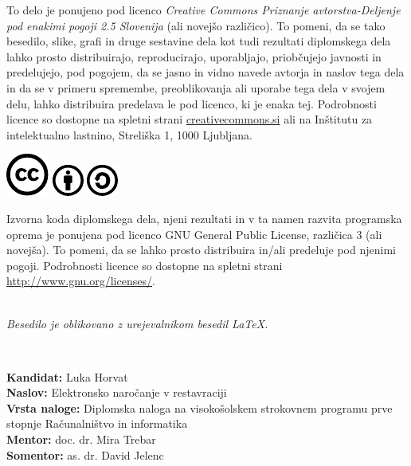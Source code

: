 \documentclass[a4paper, 12pt]{book}
\newcommand{\CcImageCc}[1]{%
	\includegraphics[scale=#1]{cc_cc_30.pdf}%
}
\newcommand{\CcImageBy}[1]{%
	\includegraphics[scale=#1]{cc_by_30.pdf}%
}
\newcommand{\CcImageSa}[1]{%
	\includegraphics[scale=#1]{cc_sa_30.pdf}%
}
\newcommand{\clearemptydoublepage}{\newpage{\pagestyle{empty}\cleardoublepage}}
\begin{document}
\vspace*{5cm}
{\small \noindent
To delo je ponujeno pod licenco \textit{Creative Commons Priznanje avtorstva-Deljenje pod enakimi pogoji 2.5 Slovenija} (ali novej\v so razli\v cico).
To pomeni, da se tako besedilo, slike, grafi in druge sestavine dela kot tudi rezultati diplomskega dela lahko prosto distribuirajo,
reproducirajo, uporabljajo, priobčujejo javnosti in predelujejo, pod pogojem, da se jasno in vidno navede avtorja in naslov tega
dela in da se v primeru spremembe, preoblikovanja ali uporabe tega dela v svojem delu, lahko distribuira predelava le pod
licenco, ki je enaka tej.
Podrobnosti licence so dostopne na spletni strani \href{http://creativecommons.si}{creativecommons.si} ali na Inštitutu za
intelektualno lastnino, Streliška 1, 1000 Ljubljana.

\vspace*{1cm}
\begin{center}%
\CcImageCc{0.741573033707865}\hspace*{1ex}\CcImageBy{1}\hspace*{1ex}\CcImageSa{1}%
\end{center}
}

\vspace*{1cm}
{\small \noindent
Izvorna koda diplomskega dela, njeni rezultati in v ta namen razvita programska oprema je ponujena pod licenco GNU General Public License,
različica 3 (ali novejša). To pomeni, da se lahko prosto distribuira in/ali predeluje pod njenimi pogoji.
Podrobnosti licence so dostopne na spletni strani \url{http://www.gnu.org/licenses/}.
}

\vfill
\begin{center} 
\ \\ \vfill
{\em
Besedilo je oblikovano z urejevalnikom besedil \LaTeX.}
\end{center}
\clearemptydoublepage

\thispagestyle{empty}
\
\vfill

\bigskip
\noindent\textbf{Kandidat:} Luka Horvat\\
\noindent\textbf{Naslov:} Elektronsko naročanje v restavraciji\\
\noindent\textbf{Vrsta naloge:} Diplomska naloga na visokošolskem strokovnem programu prve stopnje Računalništvo in informatika \\
\noindent\textbf{Mentor:} doc. dr. Mira Trebar\\
\noindent\textbf{Somentor:} as. dr. David Jelenc
\end{document}
